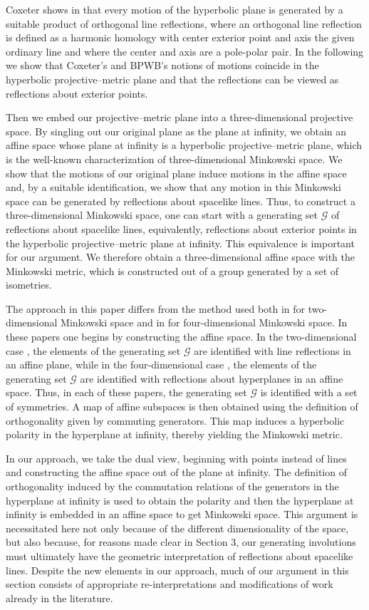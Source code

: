 \documentclass[a4paper,twoside,12pt]{article}
\begin{document}
     Coxeter shows in \cite{Cox3} that every motion of the hyperbolic
plane is generated by a suitable product of orthogonal line
reflections, where an orthogonal line reflection is defined as a
harmonic homology with center exterior point and axis the given
ordinary line and where the center and axis are a pole-polar pair. In
the following we show that Coxeter's and BPWB's notions of motions
coincide in the hyperbolic projective--metric plane and that the
reflections can be viewed as reflections about exterior points.

     Then we embed our projective--metric plane into a
three-dimensional projective space. By singling out our original plane
as the plane at infinity, we obtain an affine space whose plane at
infinity is a hyperbolic projective--metric plane, which is the
well-known characterization of three-dimensional Minkowski space.
We show that the motions of our original plane induce motions
in the affine space and, by a suitable identification, we show that
any motion in this Minkowski space can be generated by reflections
about spacelike lines. Thus, to construct a three-dimensional
Minkowski space, one can start with a generating set $\mathcal{G}$ of
reflections about spacelike lines, equivalently, reflections about
exterior points in the hyperbolic projective--metric plane at infinity. 
This equivalence is important for our argument. We therefore
obtain a three-dimensional affine space with the Minkowski metric, which is
constructed out of a group generated by a set of isometries. 

     The approach in this paper differs from the method used both in
\cite{Wo} for two-dimensional Minkowski space and in \cite{KO} for
four-dimensional Minkowski space. In these papers one begins by
constructing the affine space. In the two-dimensional case \cite{Wo},
the elements of the generating set $\mathcal{G}$ are identified with
line reflections in an affine plane, while in the four-dimensional
case \cite{KO}, the elements of the generating set $\mathcal{G}$ are
identified with reflections about hyperplanes in an affine
space. Thus, in each of these papers, the generating set $\mathcal{G}$
is identified with a set of symmetries. A map of affine subspaces is
then obtained using the definition of orthogonality given by commuting
generators. This map induces a hyperbolic polarity in the hyperplane
at infinity, thereby yielding the Minkowski metric.

     In our approach, we take the dual view, beginning with points
instead of lines and constructing the affine space out of the plane at
infinity. The definition of orthogonality induced by the commutation
relations of the generators in the hyperplane at infinity is used to
obtain the polarity and then the hyperplane at infinity is embedded in
an affine space to get Minkowski space. This argument is necessitated
here not only because of the different dimensionality of the space,
but also because, for reasons made clear in Section 3, our generating
involutions must ultimately have the geometric interpretation of
reflections about spacelike lines.  Despite the new elements in our
approach, much of our argument in this section consists of appropriate
re-interpretations and modifications of work already in the
literature.
\end{document}
